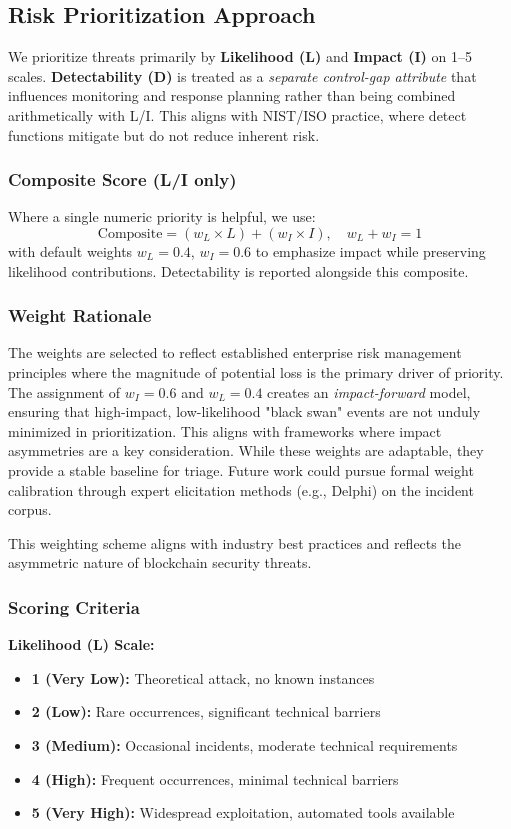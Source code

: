 \subsection{Risk Prioritization Approach}
\label{sec:risk_quantification}

We prioritize threats primarily by \textbf{Likelihood (L)} and \textbf{Impact (I)} on 1--5 scales. \textbf{Detectability (D)} is treated as a \textit{separate control-gap attribute} that influences monitoring and response planning rather than being combined arithmetically with L/I. This aligns with NIST/ISO practice, where detect functions mitigate but do not reduce inherent risk.

\subsubsection{Composite Score (L/I only)}
Where a single numeric priority is helpful, we use:
\begin{equation}
    \text{Composite} = (w_L \times L) + (w_I \times I),\quad w_L + w_I = 1
\end{equation}
with default weights $w_L=0.4$, $w_I=0.6$ to emphasize impact while preserving likelihood contributions. Detectability is reported alongside this composite.

\subsubsection{Weight Rationale}
The weights are selected to reflect established enterprise risk management principles where the magnitude of potential loss is the primary driver of priority. The assignment of $w_I=0.6$ and $w_L=0.4$ creates an \textit{impact-forward} model, ensuring that high-impact, low-likelihood "black swan" events are not unduly minimized in prioritization. This aligns with frameworks where impact asymmetries are a key consideration. While these weights are adaptable, they provide a stable baseline for triage. Future work could pursue formal weight calibration through expert elicitation methods (e.g., Delphi) on the incident corpus.

This weighting scheme aligns with industry best practices and reflects the asymmetric nature of blockchain security threats.

\subsubsection{Scoring Criteria}
\textbf{Likelihood (L) Scale:}
\begin{itemize}
    \item \textbf{1 (Very Low):} Theoretical attack, no known instances
    \item \textbf{2 (Low):} Rare occurrences, significant technical barriers
    \item \textbf{3 (Medium):} Occasional incidents, moderate technical requirements
    \item \textbf{4 (High):} Frequent occurrences, minimal technical barriers
    \item \textbf{5 (Very High):} Widespread exploitation, automated tools available
\end{itemize}

